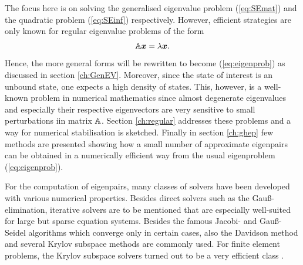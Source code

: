 The focus here is on solving the generalised eigenvalue problem (\ref{eq:SEmat}) and the quadratic problem (\ref{eq:SEinf}) respectively.
However, efficient strategies are only known for regular eigenvalue problems of the form 
\begin{equation} \label{eq:eigenprob}
\mathbb{A}\bm{x}=\lambda\bm{x}.
\end{equation}
Hence, the more general forms will be rewritten to become (\ref{eq:eigenprob}) as discussed in section \ref{ch:GenEV}.
Moreover, since the state of interest is an unbound state, one expects a high density of states. 
This, however, is a well-known problem in numerical mathematics since almost degenerate eigenvalues and especially their respective eigenvectors are very sensitive to small perturbations iin matrix $\mathbb{A}$.
Section \ref{ch:regular} addresses these problems and a way for numerical stabilisation is sketched.
Finally in section \ref{ch:ghep} few methods are presented showing how a small number of approximate eigenpairs can be obtained in a numerically efficient way from the usual eigenproblem (\ref{eq:eigenprob}).

For the computation of eigenpairs, many classes of solvers have been developed with various numerical properties.
Besides direct solvers such as the Gau\ss-elimination, iterative solvers are to be mentioned that are especially well-suited for large but sparse equation systems.
Besides the famous Jacobi- and Gau\ss-Seidel algorithms which converge only in certain cases, also the Davidson method \cite{davidson,davidson2} and several Krylov subspace methods \cite{krylov1,krylov2} are commonly used.
For finite element problems, the Krylov subspace solvers turned out to be a very efficient class \cite{slepcManual,FEMsolvers}.


